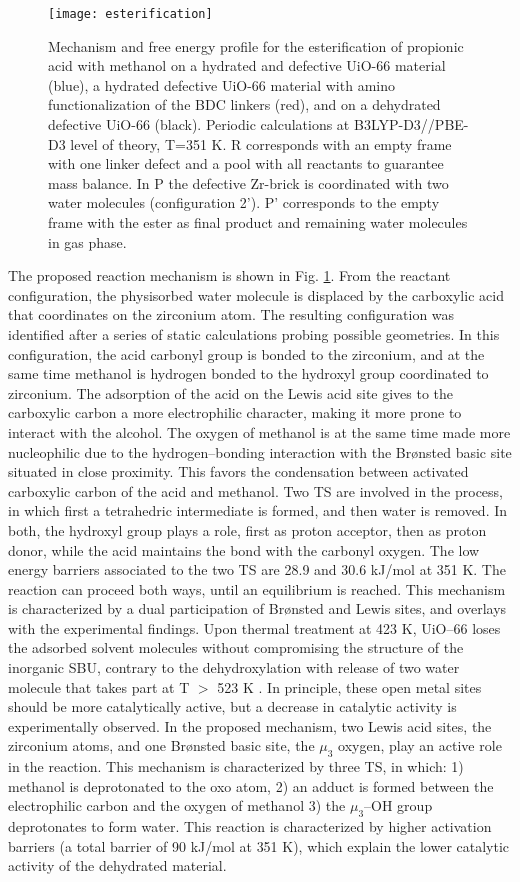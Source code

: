 \begin{figure}[!htbp]
	\centering
	\texttt{[image: esterification]}
	\caption{Mechanism and free energy profile for the esterification of propionic acid with methanol on a hydrated and defective UiO-66 material (blue), a hydrated defective UiO-66 material with amino functionalization of the BDC linkers (red), and on a dehydrated defective UiO-66 (black). Periodic calculations at B3LYP-D3//PBE-D3 level of theory, T=351 K. R corresponds with an empty frame with one linker defect and a pool with all reactants to guarantee mass balance. In P the defective Zr-brick is coordinated with two water molecules (configuration 2’). P’ corresponds to the empty frame with the ester as final product and remaining water molecules in gas phase.}
	\label{fig:esterification}
\end{figure}
\npar
The proposed reaction mechanism is shown in Fig. \ref{fig:esterification}. From the reactant configuration, the physisorbed water molecule is displaced by the carboxylic acid that coordinates on the zirconium atom. The resulting configuration was identified after a series of static calculations probing possible geometries. In this configuration, the acid carbonyl group is bonded to the zirconium, and at the same time methanol is hydrogen bonded to the hydroxyl group coordinated to zirconium. The adsorption of the acid on the Lewis acid site gives to the carboxylic carbon a more electrophilic character, making it more prone to interact with the alcohol. The oxygen of methanol is at the same time made more nucleophilic due to the hydrogen--bonding interaction with the Br\o{}nsted basic site situated in close proximity. This favors the condensation between activated carboxylic carbon of the acid and methanol. Two TS are involved in the process, in which first a tetrahedric intermediate is formed, and then water is removed. In both, the hydroxyl group plays a role, first as proton acceptor, then as proton donor, while the acid maintains the bond with the carbonyl oxygen. The low energy barriers associated to the two TS are 28.9 and 30.6 kJ/mol at 351 K. The reaction can proceed both ways, until an equilibrium is reached. This mechanism is characterized by a dual participation of Br\o{}nsted and Lewis sites, and overlays with the experimental findings.
\npar
Upon thermal treatment at 423 K, UiO--66 loses the adsorbed solvent molecules without compromising the structure of the inorganic SBU, contrary to the dehydroxylation with release of two water molecule that takes part at T $>$ 523 K \cite{valenzano2011disclosing}. In principle, these open metal sites should be more catalytically active, but a decrease in catalytic activity is experimentally observed. In the proposed mechanism, two Lewis acid sites, the zirconium atoms, and one Br\o{}nsted basic site, the $\mu_3$ oxygen, play an active role in the reaction. This mechanism is characterized by three TS, in which: 1) methanol is deprotonated to the oxo atom, 2) an adduct is formed between the electrophilic carbon and the oxygen of methanol 3) the $\mu_3$--OH group deprotonates to form water. This reaction is characterized by higher activation barriers (a total barrier of 90 kJ/mol at 351 K), which explain the lower catalytic activity of the dehydrated material.
